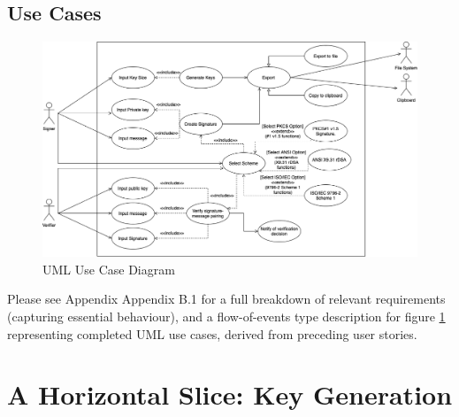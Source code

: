 \documentclass[]{final_report}
\theoremstyle{definition}
\begin{document}
\subsection{Use Cases}
\begin{figure}[H]
    \centering
    \includegraphics[scale=0.48]{poc_pictures/POC_USE-CASE.png}
    \caption{UML Use Case Diagram}
    \label{fig:uc}
\end{figure}

Please see Appendix Appendix B.1 for a full breakdown of relevant requirements (capturing essential behaviour), and a flow-of-events type description for figure \ref{fig:uc} representing completed UML use cases, derived from preceding user stories.



\section{A Horizontal Slice: Key Generation}
\end{document}
